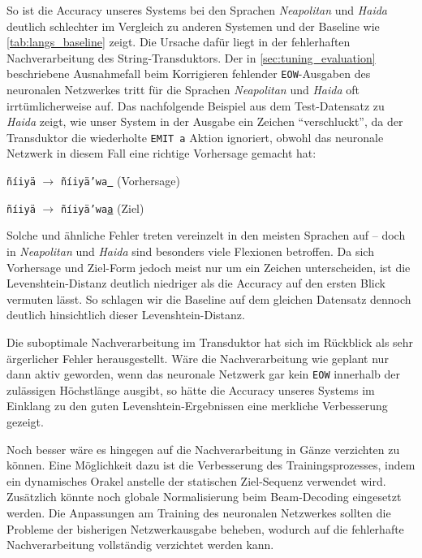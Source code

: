 \documentclass[11pt,a4paper]{article}
\newcommand{\lang}[1]{\textit{#1}}
\newcommand{\action}[1]{\texttt{#1}}
\begin{document}
So ist die Accuracy unseres Systems bei den Sprachen \lang{Neapolitan} und \lang{Haida} deutlich schlechter im Vergleich zu anderen Systemen und der Baseline wie \autoref{tab:langs_baseline} zeigt.
Die Ursache dafür liegt in der fehlerhaften Nachverarbeitung des String-Transduktors.
Der in \autoref{sec:tuning_evaluation} beschriebene Ausnahmefall beim Korrigieren fehlender \action{EOW}-Ausgaben des neuronalen Netzwerkes tritt für die Sprachen \lang{Neapolitan} und \lang{Haida} oft irrtümlicherweise auf.
Das nachfolgende Beispiel aus dem Test-Datensatz zu \lang{Haida} zeigt, wie unser System in der Ausgabe ein Zeichen \enquote{verschluckt}, da der Transduktor die wiederholte \action{EMIT a} Aktion ignoriert, obwohl das neuronale Netzwerk in diesem Fall eine richtige Vorhersage gemacht hat:
\begin{compactitem}
	\item \texttt{ñíiyä} $\to$ \texttt{ñíiyä'wa\underline{\ }} (Vorhersage)
    \item \texttt{ñíiyä} $\to$ \texttt{ñíiyä'wa\underline{a}} (Ziel)
\end{compactitem}
Solche und ähnliche Fehler treten vereinzelt in den meisten Sprachen auf -- doch in \lang{Neapolitan} und \lang{Haida} sind besonders viele Flexionen betroffen.
Da sich Vorhersage und Ziel-Form jedoch meist nur um ein Zeichen unterscheiden, ist die Levenshtein-Distanz deutlich niedriger als die Accuracy auf den ersten Blick vermuten lässt. So schlagen wir die Baseline auf dem gleichen Datensatz dennoch deutlich hinsichtlich dieser Levenshtein-Distanz.

Die suboptimale Nachverarbeitung im Transduktor hat sich im Rückblick als sehr ärgerlicher Fehler herausgestellt.
Wäre die Nachverarbeitung wie geplant nur dann aktiv geworden, wenn das neuronale Netzwerk gar kein \action{EOW} innerhalb der zulässigen Höchstlänge ausgibt, so hätte die Accuracy unseres Systems im Einklang zu den guten Levenshtein-Ergebnissen eine merkliche Verbesserung gezeigt.

Noch besser wäre es hingegen auf die Nachverarbeitung in Gänze verzichten zu können. Eine Möglichkeit dazu ist die Verbesserung des Trainingsprozesses, indem ein dynamisches Orakel anstelle der statischen Ziel-Sequenz verwendet wird.
Zusätzlich könnte noch globale Normalisierung beim Beam-Decoding eingesetzt werden.
Die Anpassungen am Training des neuronalen Netzwerkes sollten die Probleme der bisherigen Netzwerkausgabe beheben, wodurch auf die fehlerhafte Nachverarbeitung vollständig verzichtet werden kann.
\end{document}
